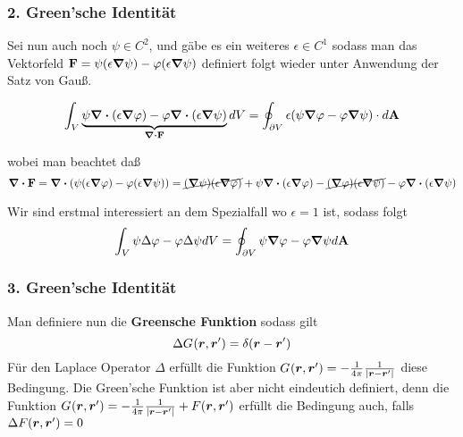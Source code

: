 \subsubsection{2. Green'sche Identität}%
\label{ssub:green-id-2}
Sei nun auch noch $\psi\in C^2$, und gäbe es ein weiteres $\epsilon\in C^1$
sodass man das Vektorfeld 
$\vb F=\psi(\epsilon\grad\psi) - \varphi(\epsilon\grad\psi)$ 
definiert folgt wieder
unter Anwendung der Satz von Gauß.

\begin{equation}
  \int_V \underbrace{\psi\div(\epsilon\grad\varphi) - \varphi\div(\epsilon\grad\psi)}_{\div \vb F} dV
  = \oint_{\partial V} \epsilon (\psi \grad \varphi - \varphi \grad \psi) 
  \cdot d\vb A
\end{equation}

wobei man beachtet daß
\begin{equation*}
  \div \vb F = \div (\psi (\epsilon\grad\varphi) - \varphi(\epsilon\grad\psi))
  = \cancel{(\grad\psi)(\epsilon\grad\varphi)} 
  + \psi\div(\epsilon\grad\varphi)
  - \cancel{(\grad\varphi)(\epsilon\grad\psi)}
  - \varphi\div(\epsilon\grad\psi)
\end{equation*}

Wir sind erstmal interessiert an dem Spezialfall wo $\epsilon=1$ ist, sodass
folgt
\begin{equation}
  \int_V \psi\Delta\varphi - \varphi\Delta\psi dV= 
  \oint_{\partial V} \psi\grad\varphi - \varphi\grad\psi d\vb A
\end{equation}

\subsubsection{3. Green'sche Identität}%
\label{ssub:green-id-3}

Man definiere nun die \textbf{Greensche Funktion} sodass gilt
\begin{equation}
  \Delta G_{}(\vb*r,\vb*r')= \delta(\vb*r - \vb*r')
\end{equation}
Für den Laplace Operator $\Delta$ erfüllt die Funktion 
$G_{}(\vb*r,\vb*r')=-\frac{1}{4\pi}\frac{1}{\abs{\vb*r-\vb*r'}}$ 
diese Bedingung. Die 
Green'sche Funktion ist aber nicht eindeutich definiert, denn die Funktion 
$G_{}(\vb*r,\vb*r')
=-\frac{1}{4\pi}\frac{1}{\abs{\vb*r-\vb*r'}} + F(\vb*r,\vb*r')$ erfüllt die
Bedingung auch, falls $\Delta F(\vb*r, \vb*r')=0$

